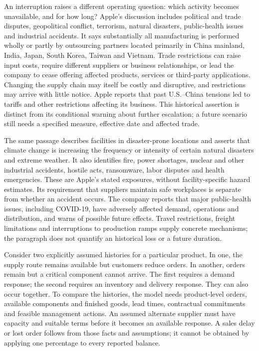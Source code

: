 An interruption raises a different operating question: which activity becomes
unavailable, and for how long? Apple's discussion includes political and trade
disputes, geopolitical conflict, terrorism, natural disasters, public-health
issues and industrial accidents. It says substantially all manufacturing is
performed wholly or partly by outsourcing partners located primarily in China
mainland, India, Japan, South Korea, Taiwan and Vietnam. Trade restrictions can
raise input costs, require different suppliers or business relationships, or
lead the company to cease offering affected products, services or third-party
applications. Changing the supply chain may itself be costly and disruptive,
and restrictions may arrive with little notice. Apple reports that past
U.S.--China tensions led to tariffs and other restrictions affecting its
business. This historical assertion is distinct from its conditional warning
about further escalation; a future scenario still needs a specified measure,
effective date and affected trade.

The same passage describes facilities in disaster-prone locations and asserts
that climate change is increasing the frequency or intensity of certain
natural disasters and extreme weather. It also identifies fire, power
shortages, nuclear and other industrial accidents, hostile acts, ransomware,
labor disputes and health emergencies. These are Apple's stated exposures,
without facility-specific hazard estimates. Its requirement that suppliers
maintain safe workplaces is separate from whether an accident occurs. The
company reports that major public-health issues, including COVID-19, have
adversely affected demand, operations and distribution, and warns of possible
future effects. Travel restrictions, freight limitations and interruptions to
production ramps supply concrete mechanisms; the paragraph does not quantify
an historical loss or a future duration.

Consider two explicitly assumed histories for a particular product. In one,
the supply route remains available but customers reduce orders. In another,
orders remain but a critical component cannot arrive. The first requires a
demand response; the second requires an inventory and delivery response.
They can also occur together. To compare the histories, the model needs
product-level orders, available components and finished goods, lead times,
contractual commitments and feasible management actions. An assumed alternate
supplier must have capacity and suitable terms before it becomes an available
response. A sales delay or lost order follows from those facts and assumptions;
it cannot be obtained by applying one percentage to every reported balance.

